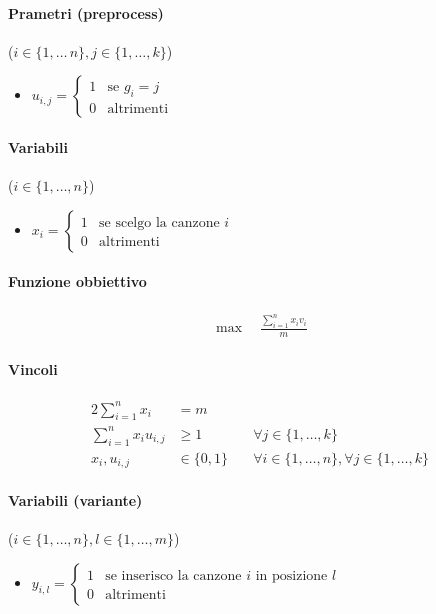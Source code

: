 \documentclass{article}
\begin{document}
\paragraph{Prametri (preprocess)} ($i \in \{1,\ldots\,n\}, j \in \{1,\ldots,k\}$)
\begin{itemize}
  \item $u_{i,j} = \begin{cases}
    1 &\text{se }g_i = j\\
    0 &\text{altrimenti}
  \end{cases}$
\end{itemize}

\paragraph{Variabili} ($i \in \{1,\ldots,n\}$)
\begin{itemize}
  \item $x_i = \begin{cases}
    1 &\text{se scelgo la canzone }i\\
    0 &\text{altrimenti}
  \end{cases}$
\end{itemize}

\paragraph{Funzione obbiettivo}
\begin{align*}
  \max \quad \frac{\sum_{i=1}^n x_i v_i}{m}
\end{align*}

\paragraph{Vincoli}
\begin{alignat}{2}
  \sum_{i=1}^n x_i &= m &\\
  \sum_{i=1}^n x_i u_{i,j} &\geq 1 &\forall j \in \{1,\ldots,k\}\\
  x_i, u_{i,j} &\in \{0,1\} \quad &\forall i \in \{1,\ldots,n\}, \forall j \in \{1,\ldots,k\}
\end{alignat}

\paragraph{Variabili (variante)} ($i \in \{1,\ldots,n\}, l \in \{1,\ldots,m\}$)
\begin{itemize}
  \item $y_{i,l} = \begin{cases}
    1 &\text{se inserisco la canzone }i\text{ in posizione }l\\
    0 &\text{altrimenti}
  \end{cases}$
\end{itemize}
\end{document}
